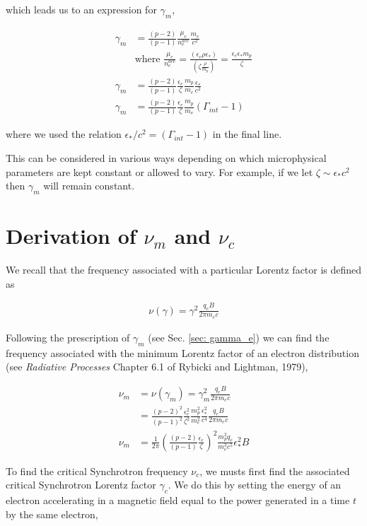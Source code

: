 \documentclass[linenumbers,twocolumn]{aastex631}
\begin{document}
\begin{appendix}
which leads us to an expression for $\gamma_m$,

\begin{align}
	\gamma_m &= \frac{(p-2)}{(p-1)}\frac{\mu_e}{n_e^{acc}}\frac{m_e}{c^2}\\
	&\text{where } \frac{\mu_e}{n_e^{acc}} = \frac{(\epsilon_e \rho \epsilon_*)}{(\zeta \frac{\rho}{m_p})} = \frac{\epsilon_e \epsilon_* m_p}{\zeta}\\
	\gamma_m &= \frac{(p-2)}{(p-1)} \frac{\epsilon_e}{\zeta} \frac{m_p}{m_e} \frac{\epsilon_*}{c^2} \\
	\gamma_m &= \frac{(p-2)}{(p-1)} \frac{\epsilon_e}{\zeta} \frac{m_p}{m_e} (\Gamma_{int} -1)
\end{align}

where we used the relation $\epsilon_*/c^2 = (\Gamma_{int} - 1)$ in the final line.

This can be considered in various ways depending on which microphysical parameters are kept constant or allowed to vary. For example, if we let $\zeta \sim \epsilon_* c^2$ then $\gamma_m$ will remain constant.

\section[Derivation of nu_m and nu_c]{Derivation of $\nu_m$ and $\nu_c$}

We recall that the frequency associated with a particular Lorentz factor is defined as

\begin{align}
	\nu(\gamma) = \gamma^2 \frac{q_e B}{2\pi m_e c}
\end{align}

Following the prescription of $\gamma_m$ (see Sec. \ref{sec: gamma_e}) we can find the frequency associated with the minimum Lorentz factor of an electron distribution (see \textit{Radiative Processes} Chapter 6.1 of Rybicki and Lightman, 1979),

\begin{align}
	\nu_m &= \nu(\gamma_m) = \gamma_m^2 \frac{q_e B}{2 \pi m_e c}\\
	&= \frac{(p-2)^2}{(p-1)^2} \frac{\epsilon_e^2}{\zeta^2} \frac{m_p^2}{m_e^2} \frac{\epsilon_*^2}{c^4} \frac{q_e B}{2 \pi m_e c}\\
	\nu_m &= \frac{1}{2\pi} \left(\frac{(p-2)}{(p-1)} \frac{\epsilon_e}{\zeta}\right)^2 \frac{m_p^2 q_e}{m_e^3 c^5} \epsilon_*^2 B
\end{align}

To find the critical Synchrotron frequency $\nu_c$, we musts first find the associated critical Synchrotron Lorentz factor $\gamma_c$. We do this by setting the energy of an electron accelerating in a magnetic field equal to the power generated in a time $t$ by the same electron,


\end{appendix}
\end{document}
